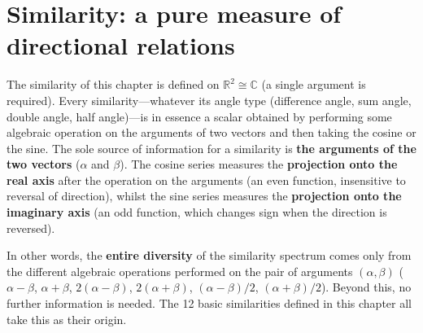 \section{\texorpdfstring{Similarity: a pure measure of directional relations}{Similarity: a pure measure of directional relations}}

\begin{definition}\label{def:similarity_root}
The similarity of this chapter is defined on $\mathbb{R}^2\cong\mathbb{C}$ (a single argument is required). Every similarity---whatever its angle type (difference angle, sum angle, double angle, half angle)---is in essence a scalar obtained by performing some algebraic operation on the arguments of two vectors and then taking the cosine or the sine. The sole source of information for a similarity is \textbf{the arguments of the two vectors} ($\alpha$ and $\beta$). The cosine series measures the \textbf{projection onto the real axis} after the operation on the arguments (an even function, insensitive to reversal of direction), whilst the sine series measures the \textbf{projection onto the imaginary axis} (an odd function, which changes sign when the direction is reversed).

In other words, the \textbf{entire diversity} of the similarity spectrum comes only from the different algebraic operations performed on the pair of arguments $(\alpha, \beta)$ ($\alpha - \beta$, $\alpha + \beta$, $2(\alpha - \beta)$, $2(\alpha + \beta)$, $(\alpha - \beta)/2$, $(\alpha + \beta)/2$). Beyond this, no further information is needed. The 12 basic similarities defined in this chapter all take this as their origin.
\end{definition}


